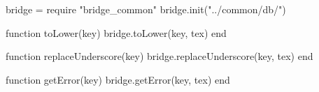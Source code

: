 \begin{luacode}

  bridge = require "bridge_common"
  bridge.init("../common/db/")

  function toLower(key)
    bridge.toLower(key, tex)
  end

  function replaceUnderscore(key)
    bridge.replaceUnderscore(key, tex)
  end

  function getError(key)
    bridge.getError(key, tex)
  end

\end{luacode}

